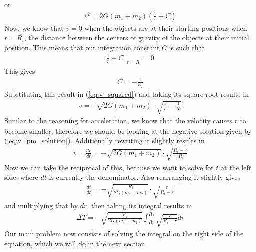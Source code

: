 \documentclass{article}
\begin{document}
or 
\begin{align}
    \label{eq:v_squared}
    v^2 = 2G (m_1 + m_2) (\frac{1}{r} + C)
\end{align}
Now, we know that $v=0$ when the objects are at their starting positions when $r=R_i$, the distance between the centers of gravity of the objects at their initial position. This means that our integration constant $C$ is such that
\begin{align}
    \frac{1}{r} + C ~ \bigg|_{r=R_i} = 0
\end{align}
This gives
\begin{align}
    C = -\frac{1}{R_i}
\end{align}
Substituting this result in (\ref{eq:v_squared}) and taking its square root results in
\begin{align}
    \label{eq:v_pm_solution}
    v = \pm \sqrt{2G (m_1 + m_2)}  \cdot \sqrt{\frac{1}{r} - \frac{1}{R_i}}
\end{align}
Similar to the reasoning for acceleration, we know that the velocity causes $r$ to become smaller, therefore we should be looking at the negative solution given by (\ref{eq:v_pm_solution}). Additionally rewriting it slightly results in
\begin{align}
    v = \frac{dr}{dt} = - \sqrt{2G(m_1 + m_2)} \cdot \sqrt{\frac{R_i - r}{ rR_i}}
\end{align}
Now we can take the reciprocal of this, because we want to solve for $t$ at the left side, where $dt$ is currently the denominator. Also rearranging it slightly gives
\begin{align}
    \frac{dt}{dr} = - \sqrt{\frac{R_i}{2G(m_1 + m_2)}} \cdot \sqrt{\frac{r}{R_i - r}}
\end{align}
and multiplying that by $dr$, then taking its integral results in
\begin{align}
    \label{eq:primary_solution}
    \Delta T =  - \sqrt{\frac{R_i}{2G(m_1 + m_2)}} \int_{R_i}^{R_f} \sqrt{\frac{r}{R_i - r}} dr
\end{align}
Our main problem now consists of solving the integral on the right side of the equation, which we will do in the next section
\end{document}
